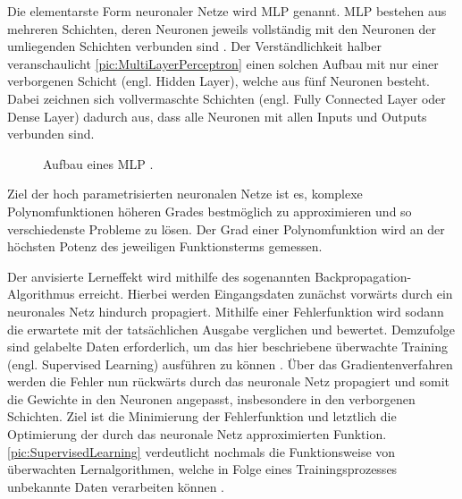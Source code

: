 \noindent
Die elementarste Form neuronaler Netze wird \ac{MLP} genannt. \ac{MLP} bestehen aus mehreren Schichten, deren Neuronen jeweils vollständig mit den Neuronen der umliegenden Schichten verbunden sind \cite[S.~131]{ZHA20}. Der Verständlichkeit halber veranschaulicht \autoref{pic:MultiLayerPerceptron} einen solchen Aufbau mit nur einer verborgenen Schicht (engl. Hidden Layer), welche aus fünf Neuronen besteht. Dabei zeichnen sich vollvermaschte Schichten (engl. Fully Connected Layer oder Dense Layer) dadurch aus, dass alle Neuronen mit allen Inputs und Outputs verbunden sind.\\

\begin{figure}[h!]
  \centering
  \caption{Aufbau eines MLP \cite[S.~388]{RAS19}.}
  \label{pic:MultiLayerPerceptron}
\end{figure}

\noindent
Ziel der hoch parametrisierten neuronalen Netze ist es, komplexe Polynomfunktionen höheren Grades bestmöglich zu approximieren und so verschiedenste Probleme zu lösen. Der Grad einer Polynomfunktion wird an der höchsten Potenz des jeweiligen Funktionsterms gemessen.
\newpage

\noindent
Der anvisierte Lerneffekt wird mithilfe des sogenannten Backpropagation-Algorithmus erreicht. Hierbei werden Eingangsdaten zunächst vorwärts durch ein neuronales Netz hindurch propagiert. Mithilfe einer Fehlerfunktion wird sodann die erwartete mit der tatsächlichen Ausgabe verglichen und bewertet. Demzufolge sind gelabelte Daten erforderlich, um das hier beschriebene überwachte Training (engl. Supervised Learning) ausführen zu können \cite[S.~3]{RAS19}. Über das Gradientenverfahren werden die Fehler nun rückwärts durch das neuronale Netz propagiert und somit die Gewichte in den Neuronen angepasst, insbesondere in den verborgenen Schichten. Ziel ist die Minimierung der Fehlerfunktion und letztlich die Optimierung der durch das neuronale Netz approximierten Funktion. \autoref{pic:SupervisedLearning} verdeutlicht nochmals die Funktionsweise von überwachten Lernalgorithmen, welche in Folge eines Trainingsprozesses unbekannte Daten verarbeiten können \cite[S.~140, 169]{ZHA20}.\\

